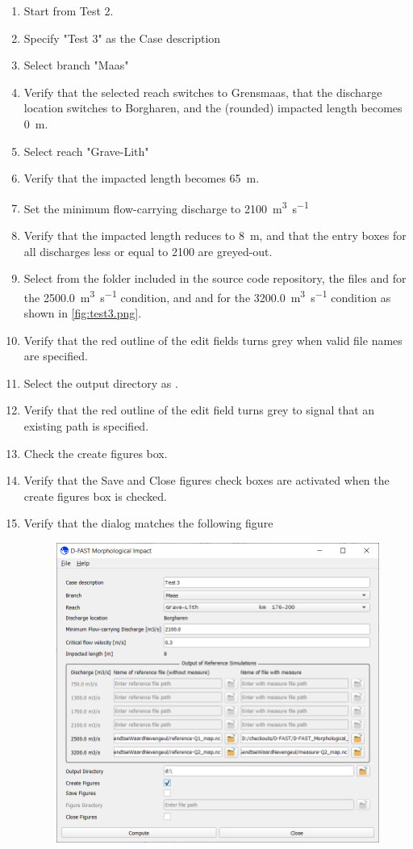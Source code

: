 \begin{enumerate}
\item Start from Test 2.
\item Specify "Test 3" as the Case description
\item Select branch "Maas"
\item Verify that the selected reach switches to Grensmaas, that the discharge location switches to Borgharen, and the (rounded) impacted length becomes \SI{0}{\metre}.
\item Select reach "Grave-Lith"
\item Verify that the impacted length becomes \SI{65}{\metre}.
\item Set the minimum flow-carrying discharge to \SI{2100}{\metre\cubed\per\second}
\item Verify that the impacted length reduces to \SI{8}{\metre}, and that the entry boxes for all discharges less or equal to 2100 are greyed-out.
\item Select from the folder  included in the \dfmi source code repository, the files  and  for the \SI{2500.0}{\metre\cubed\per\second} condition, and  and  for the \SI{3200.0}{\metre\cubed\per\second} condition as shown in \autoref{fig:test3.png}.
\item Verify that the red outline of the edit fields turns grey when valid file names are specified.
\item Select the output directory as .
\item Verify that the red outline of the edit field turns grey to signal that an existing path is specified.
\item Check the create figures box.
\item Verify that the Save and Close figures check boxes are activated when the create figures box is checked.
\item Verify that the dialog matches the following figure
\begin{figure}[H]
\center
\includegraphics[width=12cm]{figures/test3.png}

\end{figure}
\end{enumerate}

